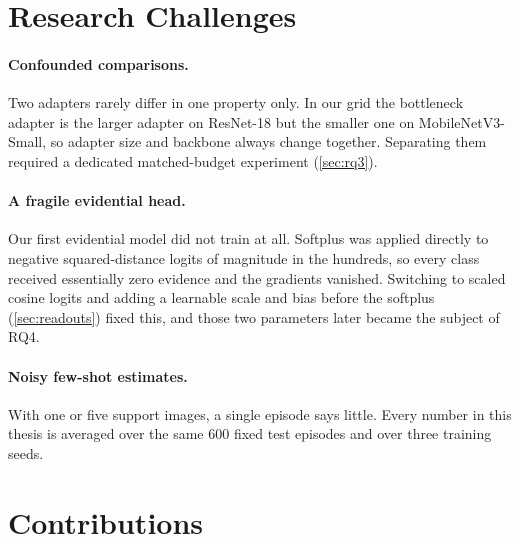 \section{Research Challenges}

\paragraph{Confounded comparisons.} Two adapters rarely differ in one property only. In our grid the
bottleneck adapter is the larger adapter on ResNet-18 but the smaller one on MobileNetV3-Small, so
adapter size and backbone always change together. Separating them required a dedicated matched-budget
experiment (\cref{sec:rq3}).

\paragraph{A fragile evidential head.} Our first evidential model did not train at all. Softplus was
applied directly to negative squared-distance logits of magnitude in the hundreds, so every class
received essentially zero evidence and the gradients vanished. Switching to scaled cosine logits and
adding a learnable scale and bias before the softplus (\cref{sec:readouts}) fixed this, and those two
parameters later became the subject of RQ4.

\paragraph{Noisy few-shot estimates.} With one or five support images, a single episode says little.
Every number in this thesis is averaged over the same 600 fixed test episodes and over three training
seeds.

\section{Contributions}

